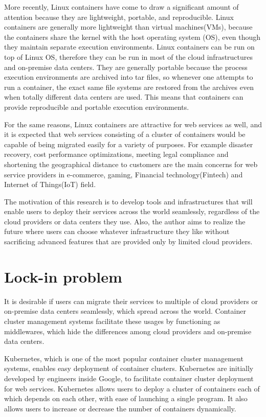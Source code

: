More recently, Linux containers\cite{menage2007adding} have come to draw a significant amount of attention because they are lightweight, portable, and reproducible.
Linux containers are generally more lightweight than virtual machines(VMs), because the containers share the kernel with the host operating system (OS), even though they maintain separate execution environments.
Linux containers can be run on top of Linux OS, therefore they can be run in most of the cloud infrastructures and on-premise data centers. 
They are generally portable because the process execution environments are archived into tar files,
so whenever one attempts to run a container, the exact same file systems are restored from the archives even when totally different data centers are used.
This means that containers can provide reproducible and portable execution environments.

For the same reasons, Linux containers are attractive for web services as well, and it is expected that web services consisting of a cluster of containers would be capable of being migrated easily for a variety of purposes.
For example disaster recovery, cost performance optimizations, meeting legal compliance and shortening the geographical distance to customers are the main concerns for web service providers in e-commerce, gaming, Financial technology(Fintech) and Internet of Things(IoT) field.

The motivation of this research is to develop tools and infrastructures that will enable users to deploy their services across the world seamlessly, regardless of the cloud providers or data centers they use.
Also, the author aims to realize the future where users can choose whatever infrastructure they like without sacrificing advanced features that are provided only by limited cloud providers.

\section{Lock-in problem}

It is desirable if users can migrate their services to multiple of cloud providers or on-premise data centers seamlessly, which spread across the world.
Container cluster management systems facilitate these usages by functioning as middlewares, which hide the differences among cloud providers and on-premise data centers.

Kubernetes\cite{K8s2017}, which is one of the most popular container cluster management systems, enables easy deployment of container clusters.
Kubernetes are initially developed by engineers inside Google, to facilitate container cluster deployment for web services.
Kubernetes allows users to deploy a cluster of containers each of which depends on each other, with ease of launching a single program.
It also allows users to increase or decrease the number of containers dynamically.

